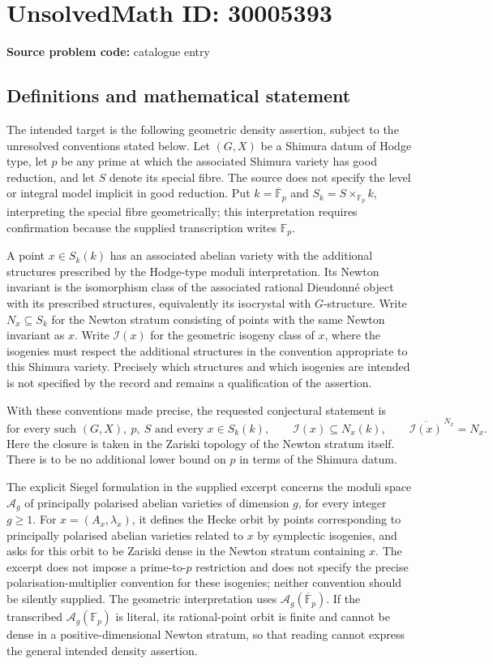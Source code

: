 \documentclass[11pt]{article}
\newcommand{\F}{\mathbb{F}}
\begin{document}
\section*{UnsolvedMath ID: 30005393}
\textbf{Source problem code:} catalogue entry
\subsection{Definitions and mathematical statement}
The intended target is the following geometric density assertion, subject to the unresolved conventions stated below. Let \((G,X)\) be a Shimura datum of Hodge type, let \(p\) be any prime at which the associated Shimura variety has good reduction, and let \(S\) denote its special fibre. The source does not specify the level or integral model implicit in good reduction. Put \(k=\overline{\F}_p\) and \(S_k=S\times_{\F_p}k\), interpreting the special fibre geometrically; this interpretation requires confirmation because the supplied transcription writes \(\F_p\).

A point \(x\in S_k(k)\) has an associated abelian variety with the additional structures prescribed by the Hodge-type moduli interpretation. Its Newton invariant is the isomorphism class of the associated rational Dieudonn\'e object with its prescribed structures, equivalently its isocrystal with \(G\)-structure. Write \(N_x\subseteq S_k\) for the Newton stratum consisting of points with the same Newton invariant as \(x\). Write \(\mathcal I(x)\) for the geometric isogeny class of \(x\), where the isogenies must respect the additional structures in the convention appropriate to this Shimura variety. Precisely which structures and which isogenies are intended is not specified by the record and remains a qualification of the assertion.

With these conventions made precise, the requested conjectural statement is
\[
 \text{for every such }(G,X),\ p,\ S\text{ and every }x\in S_k(k),
 \qquad \mathcal I(x)\subseteq N_x(k),
 \qquad \overline{\mathcal I(x)}^{\,N_x}=N_x.
\]
Here the closure is taken in the Zariski topology of the Newton stratum itself. There is to be no additional lower bound on \(p\) in terms of the Shimura datum.

The explicit Siegel formulation in the supplied excerpt concerns the moduli space \(\mathcal A_g\) of principally polarised abelian varieties of dimension \(g\), for every integer \(g\geq1\). For \(x=(A_x,\lambda_x)\), it defines the Hecke orbit by points corresponding to principally polarised abelian varieties related to \(x\) by symplectic isogenies, and asks for this orbit to be Zariski dense in the Newton stratum containing \(x\). The excerpt does not impose a prime-to-\(p\) restriction and does not specify the precise polarisation-multiplier convention for these isogenies; neither convention should be silently supplied. The geometric interpretation uses \(\mathcal A_g(\overline{\F}_p)\). If the transcribed \(\mathcal A_g(\F_p)\) is literal, its rational-point orbit is finite and cannot be dense in a positive-dimensional Newton stratum, so that reading cannot express the general intended density assertion.
\end{document}
